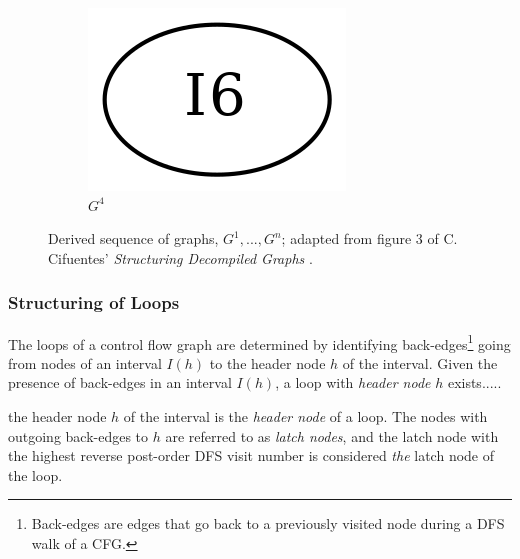 \begin{figure}[htbp]
\begin{subfigure}[b]{0.08\textwidth}
		\includegraphics[width=\textwidth]{inc/3_background/interval_method/derived_sequence_of_graphs/G_4.png}
		\vspace{2em}
		\caption{$G^4$}
	\end{subfigure}
	\caption{Derived sequence of graphs, $G^1, ..., G^n$; adapted from figure 3 of C. Cifuentes' \textit{Structuring Decompiled Graphs} \cite{structuring_decompiled_graphs}.}
	\label{fig:derived_sequence_of_graphs}
\end{figure}


\subsubsection{Structuring of Loops}

The loops of a control flow graph are determined by identifying back-edges\footnote{Back-edges are edges that go back to a previously visited node during a DFS walk of a CFG.} going from nodes of an interval $I(h)$ to the header node $h$ of the interval. Given the presence of back-edges in an interval $I(h)$, a loop with \textit{header node} $h$ exists..... 

the header node $h$ of the interval is the \textit{header node} of a loop. The nodes with outgoing back-edges to $h$ are referred to as \textit{latch nodes}, and the latch node with the highest reverse post-order DFS visit number is considered \textit{the} latch node of the loop.


